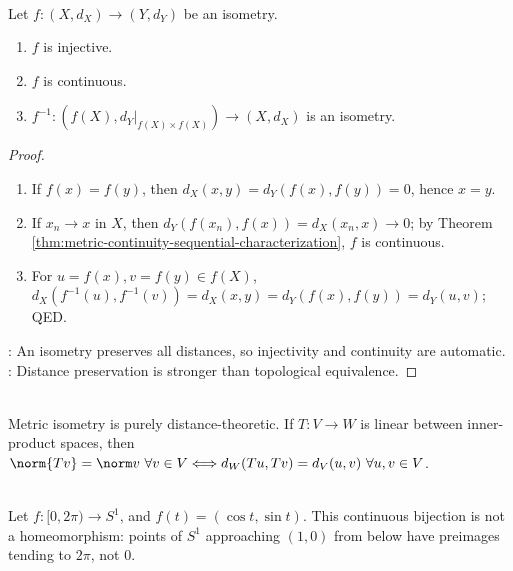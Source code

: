 \begin{theorem} \label{thm:metric-isometry-basic-properties} \\
Let $f:(X,d_X)\to(Y,d_Y)$ be an isometry.
\begin{enumerate}[label=(\roman*)]
\setlength{\itemsep}{0pt}
\item $f$ is injective.
\item $f$ is continuous.
\item $f^{-1}:(f(X),d_Y|_{f(X)\times f(X)})\to(X,d_X)$ is an isometry.
\end{enumerate}
\begin{proof}
\begin{enumerate}[label=(\roman*)]
\setlength{\itemsep}{0pt}
\item If $f(x)=f(y)$, then $d_X(x,y)=d_Y(f(x),f(y))=0$, hence $x=y$.
\item If $x_n\to x$ in $X$, then $d_Y(f(x_n),f(x))=d_X(x_n,x)\to0$; by Theorem \ref{thm:metric-continuity-sequential-characterization}, $f$ is continuous.
\item For $u=f(x),v=f(y)\in f(X)$, $d_X(f^{-1}(u),f^{-1}(v))=d_X(x,y)=d_Y(f(x),f(y))=d_Y(u,v)$; QED.
\end{enumerate}
: An isometry preserves all distances, so injectivity and continuity are automatic.\\
: Distance preservation is stronger than topological equivalence.
\end{proof}
\end{theorem}

\begin{remark} \label{rem:metric-versus-linear-isometries} \\
Metric isometry is purely distance-theoretic. If $T:V\to W$ is linear between inner-product spaces, then\\
$\norm{Tv}=\norm v\ \forall v\in V\Longleftrightarrow d_W(Tu,Tv)=d_V(u,v)\ \forall u,v\in V$.
\end{remark}

\begin{example} \label{ex:circle-param-continuous-bijection-not-homeomorphism} \\
Let $f:[0,2\pi)\to S^1$, and $f(t)=(\cos t,\sin t)$. This continuous bijection is not a homeomorphism: points of $S^1$ approaching $(1,0)$ from below have preimages tending to $2\pi$, not $0$.
\end{example}

